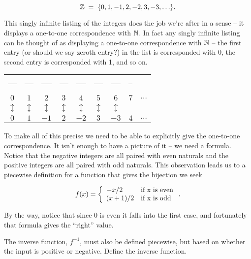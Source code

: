 \[ {\mathbb Z} \; = \; \{0, 1, -1, 2, -2, 3, -3, \ldots \}. \]

\noindent This singly infinite listing of the integers does the job 
we're after in a sense
-- it displays a one-to-one correspondence with ${\mathbb N}$.  In fact 
any singly infinite listing can be thought of as displaying a one-to-one correspondence with ${\mathbb N}$ 
-- the first entry (or should we say zeroth entry?) in the list is corresponded
with 0, the second entry is corresponded with 1, and so on.
\medskip

\begin{tabular}{ccccccccc}
\rule{32pt}{0pt} & \rule{32pt}{0pt} & \rule{32pt}{0pt} & \rule{32pt}{0pt} & \rule{32pt}{0pt} & \rule{32pt}{0pt} & \rule{32pt}{0pt} & \rule{32pt}{0pt} \\
$0$ & $1$ & $2$ & $3$ & $4$ & $5$ & $6$ & $7$ & $\ldots$ \\
$\updownarrow$ & $\updownarrow$ & $\updownarrow$ & $\updownarrow$ & $\updownarrow$ & $\updownarrow$ & $\updownarrow$ & \\
$0$ & $1$ & $-1$ & $2$ & $-2$ & $3$ & $-3$ & $4$ & $\ldots$ \\
\end{tabular}
\medskip

To make all of this precise we need to be able to explicitly give the 
one-to-one correspondence.  It isn't enough to have a picture 
of it -- we need a
formula.  Notice that the negative integers are all paired with even naturals
and the positive integers are all paired with odd naturals.  This observation
leads us to a piecewise definition for a function that gives the bijection we
seek

\[ f(x) = \left\{ \begin{array}{cl} -x/2 \rule{16pt}{0pt} & \mbox{if x is even}\\
(x + 1)/2 & \mbox{if x is odd} \end{array} \right. .\]

By the way, notice that since 0 is even it falls into the first case, and
fortunately that formula gives the ``right'' value.

\begin{exer}
The inverse function, $f^{-1}$, must also be defined piecewise, but
based on whether the input is positive or negative. Define the inverse function.
\end{exer}

